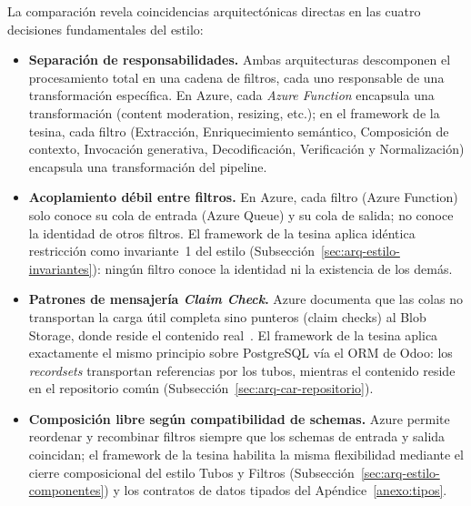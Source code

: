 La comparación revela coincidencias arquitectónicas directas en las cuatro
decisiones fundamentales del estilo:

\begin{itemize}
  \item \textbf{Separación de responsabilidades.} Ambas arquitecturas
        descomponen el procesamiento total en una cadena de filtros,
        cada uno responsable de una transformación específica.
        En Azure, cada \textit{Azure Function} encapsula una transformación
        (content moderation, resizing, etc.); en el framework de la tesina,
        cada filtro (Extracción, Enriquecimiento semántico, Composición de
        contexto, Invocación generativa, Decodificación, Verificación y
        Normalización) encapsula una transformación del pipeline.

  \item \textbf{Acoplamiento débil entre filtros.} En Azure, cada filtro
        (Azure Function) solo conoce su cola de entrada (Azure Queue) y
        su cola de salida; no conoce la identidad de otros filtros.
        El framework de la tesina aplica idéntica restricción como
        invariante~1 del estilo (Subsección~\ref{sec:arq-estilo-invariantes}):
        ningún filtro conoce la identidad ni la existencia de los demás.

  \item \textbf{Patrones de mensajería \textit{Claim Check}.} Azure documenta
        que las colas no transportan la carga útil completa sino punteros
        (claim checks) al Blob Storage, donde reside el contenido
        real~\citep{microsoft-azure:2024}. El framework de la tesina
        aplica exactamente el mismo principio sobre PostgreSQL vía el
        ORM de Odoo: los \textit{recordsets} transportan referencias por
        los tubos, mientras el contenido reside en el repositorio común
        (Subsección~\ref{sec:arq-car-repositorio}).

  \item \textbf{Composición libre según compatibilidad de schemas.}
        Azure permite reordenar y recombinar filtros siempre que los
        schemas de entrada y salida coincidan; el framework de la tesina
        habilita la misma flexibilidad mediante el cierre composicional
        del estilo Tubos y Filtros (Subsección~\ref{sec:arq-estilo-componentes})
        y los contratos de datos tipados del Apéndice~\ref{anexo:tipos}.
\end{itemize}


